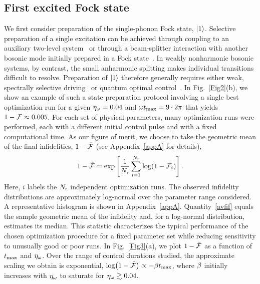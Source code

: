 \documentclass[reprint,prx,footinbib,floatfix,twocolumn,longbibliography,superscriptaddress]{revtex4-2}
\begin{document}
\subsection{First excited Fock state}
We first consider preparation of the single-phonon Fock state, $\ket{1}$.
Selective preparation of a single excitation can be achieved through coupling to an auxiliary two-level system~\cite{Law1996,Bergholm2019,Podhora2022,Yang2024} or through a beam-splitter interaction with another bosonic mode initially prepared in a Fock state~\cite{Romero-Isart2011c,Gao2019}.
In weakly nonharmonic bosonic systems, by contrast, the small anharmonic splitting makes individual transitions difficult to resolve.
Preparation of $\ket{1}$ therefore generally requires either weak, spectrally selective driving~\cite{Serwane2011,Serwane2011a} or quantum optimal control~\cite{vanFrank2016a,Grochowski2025a}.
In Fig.~\ref{Fig2}(b), we show an example of such a state preparation protocol involving a single best optimization run for a given $\eta_{\omega} = 0.04$ and $\omega t_\text{max} = 9 \cdot 2 \pi$ that yields $1 - \mathcal{F} \approx 0.005$.
For each set of physical parameters, many optimization runs were performed, each with a different initial control pulse and with a fixed computational time.
As our figure of merit, we choose to take the geometric mean of the final infidelities, $1-\bar{\mathcal{F}} $ (see Appendix~\ref{appA} for details),
\begin{align}
    1-\bar{\mathcal{F}}  = \exp\left[ \frac{1}{N_\text{r}} \sum_{i=1}^{N_\text{r}} \log (1- \mathcal{F}_i) \right].
    \label{avfif}
\end{align}
Here, $i$ labels the $N_\text{r}$ independent optimization runs.
The observed infidelity distributions are approximately log-normal over the parameter range considered.
A representative histogram is shown in Appendix~\ref{appA}.
Quantity~\eqref{avfif} equals the sample geometric mean of the infidelity and, for a log-normal distribution, estimates its median.
This statistic characterizes the typical performance of the chosen optimization procedure for a fixed parameter set while reducing sensitivity to unusually good or poor runs.
In Fig.~\ref{Fig3}(a), we plot $1-\bar{\mathcal{F}} $ as a function of $t_\text{max}$ and $\eta_{\omega}$.
Over the range of control durations studied, the approximate scaling we obtain is exponential, $\log(1-\bar{\mathcal{F}}) \propto -\beta t_\text{max}$, where $\beta$ initially increases with $\eta_{\omega}$ to saturate for $\eta_{\omega} \gtrsim 0.04$.
\end{document}
